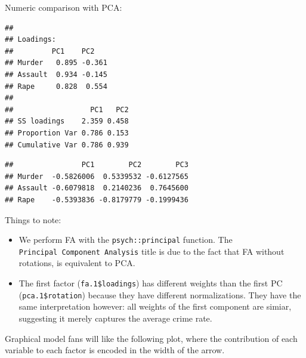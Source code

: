\documentclass[]{book}
\newenvironment{Shaded}{\begin{snugshade}}{\end{snugshade}}
\newcommand{\FloatTok}[1]{\textcolor[rgb]{0.00,0.00,0.81}{#1}}
\newcommand{\KeywordTok}[1]{\textcolor[rgb]{0.13,0.29,0.53}{\textbf{#1}}}
\newcommand{\NormalTok}[1]{#1}
\newcommand{\OperatorTok}[1]{\textcolor[rgb]{0.81,0.36,0.00}{\textbf{#1}}}
\providecommand{\tightlist}{%
  \setlength{\itemsep}{0pt}\setlength{\parskip}{0pt}}
\theoremstyle{definition}
\theoremstyle{definition}
\theoremstyle{definition}
\theoremstyle{remark}
\begin{document}
Numeric comparison with PCA:

\begin{Shaded}
\end{Shaded}

\begin{verbatim}
## 
## Loadings:
##         PC1    PC2   
## Murder   0.895 -0.361
## Assault  0.934 -0.145
## Rape     0.828  0.554
## 
##                  PC1   PC2
## SS loadings    2.359 0.458
## Proportion Var 0.786 0.153
## Cumulative Var 0.786 0.939
\end{verbatim}

\begin{Shaded}
\end{Shaded}

\begin{verbatim}
##                PC1        PC2        PC3
## Murder  -0.5826006  0.5339532 -0.6127565
## Assault -0.6079818  0.2140236  0.7645600
## Rape    -0.5393836 -0.8179779 -0.1999436
\end{verbatim}

Things to note:

\begin{itemize}
\tightlist
\item
  We perform FA with the \texttt{psych::principal} function. The \texttt{Principal\ Component\ Analysis} title is due to the fact that FA without rotations, is equivalent to PCA.
\item
  The first factor (\texttt{fa.1\$loadings}) has different weights than the first PC (\texttt{pca.1\$rotation}) because they have different normalizations. They have the same interpretation however: all weights of the first component are simiar, suggesting it merely captures the average crime rate.
\end{itemize}

Graphical model fans will like the following plot, where the contribution of each variable to each factor is encoded in the width of the arrow.

\begin{Shaded}
\end{Shaded}
\end{document}
